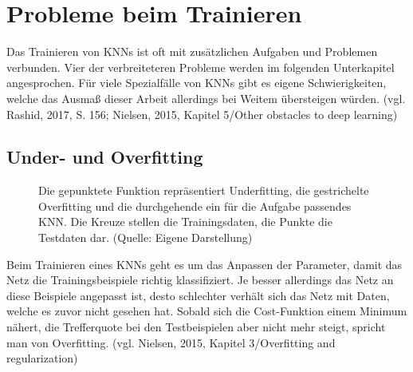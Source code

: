 \documentclass[a4paper,12pt,ngerman,oneside]{scrreprt}	%
\begin{document}
			
				
		\section{Probleme beim Trainieren}
		Das Trainieren von KNNs ist oft mit zusätzlichen Aufgaben und Problemen verbunden. Vier der verbreiteteren Probleme werden im folgenden Unterkapitel angesprochen. Für viele Spezialfälle von KNNs gibt es eigene Schwierigkeiten, welche das Ausmaß dieser Arbeit allerdings bei Weitem übersteigen würden. (vgl. Rashid, 2017, S. 156; Nielsen, 2015, Kapitel 5/Other obstacles to deep learning)
			\subsection{Under- und Overfitting} \label{UnderOverFitting}
			\begin{wrapfigure}{}{0cm} %
				\caption{Die gepunktete Funktion repräsentiert Underfitting, die gestrichelte Overfitting und die durchgehende ein für die Aufgabe passendes KNN. Die Kreuze stellen die Trainingsdaten, die Punkte die Testdaten dar. (Quelle: Eigene Darstellung)}\label{UnderOverFittingGraph}
			\end{wrapfigure}
			Beim Trainieren eines KNNs geht es um das Anpassen der Parameter, damit das Netz die Trainingsbeispiele richtig klassifiziert. Je besser allerdings das Netz an diese Beispiele angepasst ist, desto schlechter verhält sich das Netz mit Daten, welche es zuvor nicht gesehen hat. Sobald sich die Cost-Funktion einem Minimum nähert, die Trefferquote bei den Testbeispielen aber nicht mehr steigt, spricht man von Overfitting. (vgl. Nielsen, 2015, Kapitel 3/Overfitting and regularization)
			
\end{document}
